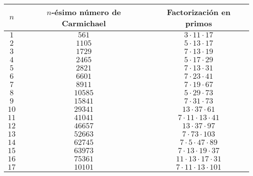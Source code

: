 \documentclass{article}
\theoremstyle{definition}
\begin{document}
\begin{table}[h]
\centering
	\begin{tabulary}{0.9\textwidth}{| C| C|C|}
		\hline
		$n$  & $n$-ésimo número de Carmichael & Factorización en primos \\ \hline
		
		$1$ &  $561$  & $3 \cdot 11 \cdot 17$ \\ \hline
		
		$2$ & $1105$  & $5 \cdot 13 \cdot 17$  \\ \hline
		
		$3$ &  $1729$  & $7 \cdot 13 \cdot 19$ \\ \hline
		
		$4$ & $2465$  & $5 \cdot 17 \cdot 29$  \\ \hline
		
		$5$ & $2821$  & $7 \cdot 13 \cdot 31$  \\ \hline
		
		$6$ & $6601$  & $7 \cdot 23 \cdot 41$  \\ \hline
		
		$7$ & $8911$  & $7 \cdot 19 \cdot 67$  \\ \hline
		
		$8$ & $10585$  & $5 \cdot 29 \cdot 73$  \\ \hline
		
		$9$ & $15841$  & $7 \cdot 31 \cdot 73$  \\ \hline
		
		$10$ & $29341$  & $13 \cdot 37 \cdot 61$  \\ \hline
		
		$11$ & $41041$  & $7 \cdot 11 \cdot 13 \cdot 41$  \\  \hline

		$12$ & $46657$  & $13 \cdot 37 \cdot 97$   \\  \hline

	$13$ & $52663$  & $7 \cdot 73 \cdot 103$   \\  \hline

	$14$ & $62745$  & $7 \cdot 5 \cdot 47 \cdot 89$   \\  \hline

	$15$ & $63973$  & $7 \cdot 13 \cdot 19 \cdot 37$   \\  \hline

	$16$ & $75361$  & $11 \cdot 13 \cdot 17 \cdot 31$   \\  \hline

	$17$ & $10101$  & $7 \cdot 11 \cdot 13 \cdot 101$   \\  \hline


\end{tabulary}
\end{table}
\end{document}
